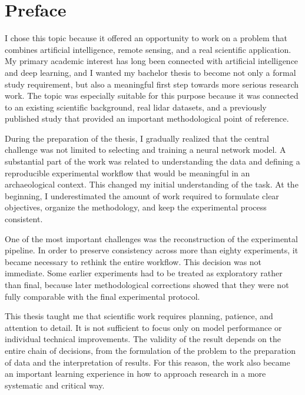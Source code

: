 
\chapter*{Preface}\label{ch:preface}

I chose this topic because it offered an opportunity to work on a problem that combines artificial intelligence, remote sensing, and a real scientific application. My primary academic interest has long been connected with artificial intelligence and deep learning, and I wanted my bachelor thesis to become not only a formal study requirement, but also a meaningful first step towards more serious research work. The topic was especially suitable for this purpose because it was connected to an existing scientific background, real \gls{lidar} datasets, and a previously published study that provided an important methodological point of reference.

During the preparation of the thesis, I gradually realized that the central challenge was not limited to selecting and training a neural network model. A substantial part of the work was related to understanding the data and defining a reproducible experimental workflow that would be meaningful in an archaeological context. This changed my initial understanding of the task. At the beginning, I underestimated the amount of work required to formulate clear objectives, organize the methodology, and keep the experimental process consistent.

One of the most important challenges was the reconstruction of the experimental pipeline. In order to preserve consistency across more than eighty experiments, it became necessary to rethink the entire workflow. This decision was not immediate. Some earlier experiments had to be treated as exploratory rather than final, because later methodological corrections showed that they were not fully comparable with the final experimental protocol.

This thesis taught me that scientific work requires planning, patience, and attention to detail. It is not sufficient to focus only on model performance or individual technical improvements. The validity of the result depends on the entire chain of decisions, from the formulation of the problem to the preparation of data and the interpretation of results. For this reason, the work also became an important learning experience in how to approach research in a more systematic and critical way.